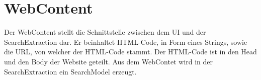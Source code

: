 
\section{WebContent}

Der WebContent stellt die Schnittstelle zwischen dem UI und der SearchExtraction dar. Er beinhaltet HTML-Code, in Form eines Strings, sowie die URL, von welcher der HTML-Code stammt. Der HTML-Code ist in den Head und den Body der Website geteilt.\newline
Aus dem WebContet wird in der SearchExtraction ein SearchModel erzeugt.

